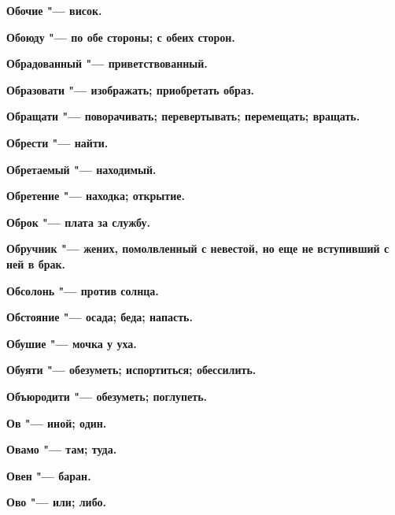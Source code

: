 \begin{multicols}{2}
\bfseries Обочие\normalfont{} "--- висок. 




\bfseries Обоюду\normalfont{} "--- по обе стороны; с обеих сторон. 




\bfseries Обрадованный\normalfont{} "--- приветствованный. 




\bfseries Образовати\normalfont{} "--- изображать; приобретать образ. 




\bfseries Обращати\normalfont{} "--- поворачивать; перевертывать; перемещать; вращать. 




\bfseries Обрести\normalfont{} "--- найти. 




\bfseries Обретаемый\normalfont{} "--- находимый. 




\bfseries Обретение\normalfont{} "--- находка; открытие. 




\bfseries Оброк\normalfont{} "--- плата за службу. 




\bfseries Обручник\normalfont{} "--- жених, помолвленный с невестой, но еще не вступивший с ней в брак. 




\bfseries Обсолонь\normalfont{} "--- против солнца. 




\bfseries Обстояние\normalfont{} "--- осада; беда; напасть. 




\bfseries Обушие\normalfont{} "--- мочка у уха. 




\bfseries Обуяти\normalfont{} "--- обезуметь; испортиться; обессилить. 




\bfseries Объюродити\normalfont{} "--- обезуметь; поглупеть. 




\bfseries Ов\normalfont{} "--- иной; один. 




\bfseries Овамо\normalfont{} "--- там; туда. 




\bfseries Овен\normalfont{} "--- баран. 




\bfseries Ово\normalfont{} "--- или; либо. 





\end{multicols}
